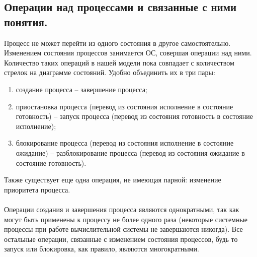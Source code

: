 \documentclass[a4paper]{article}
\begin{document}
\subsection{\Large Операции над процессами и связанные с ними понятия.}
Процесс не может перейти из одного состояния в другое самостоятельно. Изменением состояния процессов занимается ОС, совершая операции над ними. Количество таких операций в нашей модели пока совпадает с количеством стрелок на диаграмме состояний. Удобно объединить их в три пары:
\begin{enumerate}
  \item создание процесса – завершение процесса;
  \item приостановка процесса (перевод из состояния исполнение в состояние готовность) – запуск процесса (перевод из состояния готовность в состояние исполнение);
  \item блокирование процесса (перевод из состояния исполнение в состояние ожидание) – разблокирование процесса (перевод из состояния ожидание в состояние готовность).
\end{enumerate}
Также существует еще одна операция, не имеющая парной: изменение приоритета процесса. \\\\
Операции создания и завершения процесса являются однократными, так как могут быть применены к процессу не более одного раза (некоторые системные процессы при работе вычислительной системы не завершаются никогда). Все остальные операции, связанные с изменением состояния процессов, будь то запуск или блокировка, как правило, являются многократными.
\end{document}
